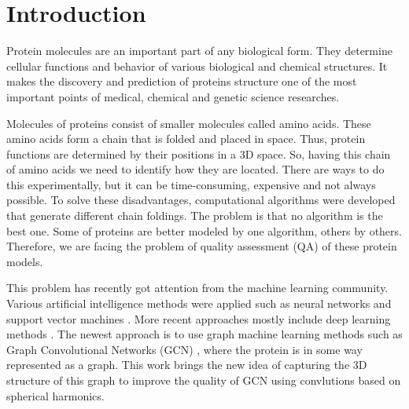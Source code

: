 \documentclass[12pt,twoside]{article}
\title
{Quality prediction of proteins models with spherical convolutions on three-dimensional graphs}
\author
{Nikita Pavlichenko$^1$, Sergei Grudinin$^2$, Ilia Igashov$^{1,2}$.} %
\begin{document}
	
	\maketitle
	
	\section{Introduction}
	Protein molecules are an important part of any biological form. They determine cellular 
	functions and behavior of various biological and chemical structures. It makes the discovery 
	and prediction of proteins structure one of the most important points of medical, chemical 
	and genetic science researches.

	Molecules of proteins consist of smaller molecules called amino acids. These amino acids
	form a chain that is folded and placed in space. Thus, protein functions are determined
	by their positions in a 3D space. So, having this chain of amino acids we need to identify
	how they are located. There are ways to do this experimentally, but it can be time-consuming,
	expensive and not always possible. To solve these disadvantages, computational algorithms \cite{Arnold2005}\cite{Lundstroem2008}\cite{Xu2019}
	were developed that generate different chain foldings. The problem is that no algorithm is the 
	best one. Some of proteins are better modeled by one algorithm, others by others. Therefore, we 
	are facing the problem of quality assessment (QA) of these protein models.

	This problem has recently got attention from the machine learning community. Various artificial
	intelligence methods were applied such as neural networks \cite{Wallner2003} and support vector machines \cite{Ray2012}\cite{Uziela2016}.
	More recent approaches mostly include deep learning methods \cite{Hurtado2018}\cite{Derevyanko2018}\cite{Pages2019}\cite{Conover2019}. The newest approach is to use graph
	machine learning methods such as Graph Convolutional Networks (GCN) \cite{Baldassarre2020GRAPHQAPM}, where the protein is in some
	way represented as a graph. This work brings the new idea of capturing the 3D structure of this graph 
	to improve the quality of GCN using convlutions based on spherical harmonics.
\end{document}
